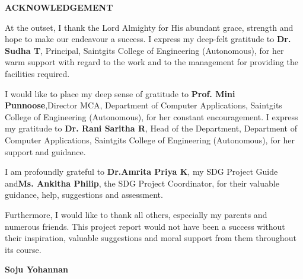 \newpage
\thispagestyle{empty}

\begin{center}
\fontsize{16pt}{18pt}\selectfont
\textbf{ACKNOWLEDGEMENT}
\end{center}

\vspace{1cm}

At the outset, I thank the Lord Almighty for His abundant grace, strength and hope to make our
endeavour a success. I express my deep-felt gratitude to \textbf{Dr. Sudha T}, Principal, Saintgits
College of Engineering (Autonomous), for her warm support with regard to the work and to the
management for providing the facilities required.

I would like to place my deep sense of gratitude to \textbf{Prof. Mini Punnoose},\linebreak Director
MCA, Department of Computer Applications, Saintgits College of Engineering (Autonomous), for her
constant encouragement. I express my gratitude to \linebreak\textbf{Dr. Rani Saritha R}, Head of the
Department, Department of Computer Applications, Saintgits College of Engineering (Autonomous),
for her support and guidance.

I am profoundly grateful to \textbf{Dr.Amrita Priya K}, my SDG Project Guide and\linebreak\textbf{Ms.
Ankitha Philip}, the SDG Project Coordinator, for their valuable guidance, help, suggestions and
assessment.

Furthermore, I would like to thank all others, especially my parents and numerous friends. This
project report would not have been a success without their inspiration, valuable suggestions and
moral support from them throughout its course.

\vspace{2cm}

\begin{flushright}
\textbf{Soju Yohannan}
\end{flushright}
